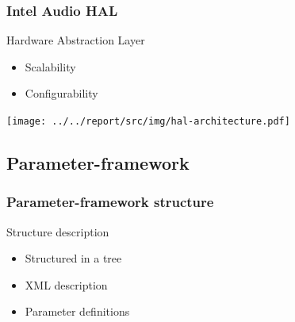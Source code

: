 \begin{frame}
    \frametitle{Intel Audio HAL}
    \begin{minipage}{0.40\textwidth}
        \begin{block}{Hardware Abstraction Layer}
            \begin{itemize}
                \item Scalability
                \item Configurability
            \end{itemize}
        \end{block}
    \end{minipage}
    \begin{minipage}{0.50\textwidth}
        \flushright
        \texttt{[image: ../../report/src/img/hal-architecture.pdf]}
    \end{minipage}
\end{frame}


\subsection{Parameter-framework}
\begin{frame}
    \frametitle{Parameter-framework structure}
    \begin{minipage}{0.40\textwidth}
    \begin{block}{Structure description}
        \begin{itemize}
            \item Structured in a tree
            \item XML description
            \item Parameter definitions
        \end{itemize}
    \end{block}
    \end{minipage}
    \begin{minipage}{0.50\textwidth}
    \end{minipage}
\end{frame}

